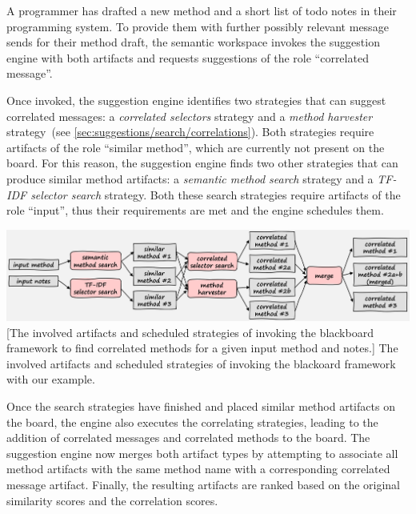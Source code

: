 \begin{example}
	A programmer has drafted a new method and a short list of todo notes in their programming system.
	To provide them with further possibly relevant message sends for their method draft, the semantic workspace invokes the suggestion engine with both artifacts and requests suggestions of the role ``correlated message''.

	Once invoked, the suggestion engine identifies two strategies that can suggest correlated messages: a \emph{correlated selectors} strategy and a \emph{method harvester} strategy~(see \cref{sec:suggestions/search/correlations}).
	Both strategies require artifacts of the role ``similar method'', which are currently not present on the board.
	For this reason, the suggestion engine finds two other strategies that can produce similar method artifacts: a \emph{semantic method search} strategy and a \emph{TF-IDF selector search} strategy.
	Both these search strategies require artifacts of the role ``input'', thus their requirements are met and the engine schedules them.

	\vspace{\baselineskip}
	\begin{center}
		\includegraphics[width=\textwidth]{02_suggestions/example.png}
		[The involved artifacts and scheduled strategies of invoking the blackboard framework to find correlated methods for a given input method and notes.]{
			The involved artifacts and scheduled strategies of invoking the blackoard framework with our example.
		}
		\label{fig:design/suggestions/example}
	\end{center}

	Once the search strategies have finished and placed similar method artifacts on the board, the engine also executes the correlating strategies, leading to the addition of correlated messages and correlated methods to the board.
	The suggestion engine now merges both artifact types by attempting to associate all method artifacts with the same method name with a corresponding correlated message artifact.
	Finally, the resulting artifacts are ranked based on the original similarity scores and the correlation scores.
\end{example}

